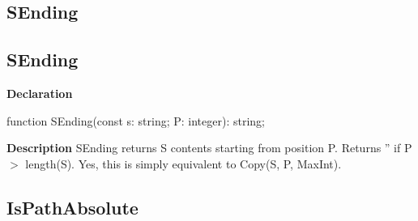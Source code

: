 \documentclass{report}
\newif\ifpdf
\begin{document}
\subsection*{\large{\textbf{SEnding}}\normalsize\hspace{1ex}\hrulefill}
\else
\subsection*{SEnding}
\fi
\label{PasDoc_Utils-SEnding}
\begin{list}{}{
\setlength{\itemindent}{0cm}
\setlength{\listparindent}{0cm}
\setlength{\leftmargin}{\evensidemargin}
\addtolength{\leftmargin}{\tmplength}
\settowidth{\labelsep}{X}
\addtolength{\leftmargin}{\labelsep}
\setlength{\labelwidth}{\tmplength}
}
\item[\textbf{Declaration}\hfill]
\ifpdf
\begin{flushleft}
\fi
\begin{ttfamily}
function SEnding(const s: string; P: integer): string;\end{ttfamily}

\ifpdf
\end{flushleft}
\fi

\par
\item[\textbf{Description}]
SEnding returns S contents starting from position P. Returns '' if P {$>$} length(S). Yes, this is simply equivalent to Copy(S, P, MaxInt).

\end{list}
\ifpdf
\subsection*{\large{\textbf{IsPathAbsolute}}\normalsize\hspace{1ex}\hrulefill}
\else
\end{document}
